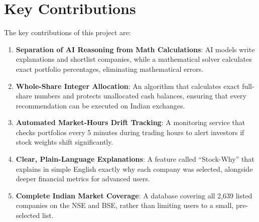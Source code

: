 \section{Key Contributions}
The key contributions of this project are:
\begin{enumerate}
    \item \textbf{Separation of AI Reasoning from Math Calculations}: AI models write explanations and shortlist companies, while a mathematical solver calculates exact portfolio percentages, eliminating mathematical errors.
    \item \textbf{Whole-Share Integer Allocation}: An algorithm that calculates exact full-share numbers and protects unallocated cash balances, ensuring that every recommendation can be executed on Indian exchanges.
    \item \textbf{Automated Market-Hours Drift Tracking}: A monitoring service that checks portfolios every 5 minutes during trading hours to alert investors if stock weights shift significantly.
    \item \textbf{Clear, Plain-Language Explanations}: A feature called ``Stock-Why'' that explains in simple English exactly why each company was selected, alongside deeper financial metrics for advanced users.
    \item \textbf{Complete Indian Market Coverage}: A database covering all 2,639 listed companies on the NSE and BSE, rather than limiting users to a small, pre-selected list.
\end{enumerate}

